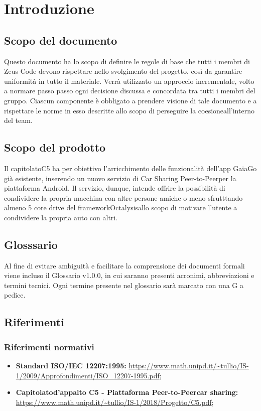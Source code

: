 \section {Introduzione}
\subsection {Scopo del documento}
Questo documento  ha lo scopo di definire le regole di base che tutti i membri di Zeus Code devono rispettare nello svolgimento del progetto, così da garantire uniformità in tutto il materiale. Verrà utilizzato un approccio incrementale\glo, volto a normare passo passo ogni decisione discussa e concordata tra tutti i membri del gruppo. Ciascun componente è obbligato a prendere visione di tale documento e a rispettare le norme in esso descritte allo scopo di perseguire la coesione\glosp all'interno del team.
\subsection {Scopo del prodotto}
Il capitolato\glosp C5 ha per obiettivo l'arricchimento delle funzionalità dell'app GaiaGo già esistente, inserendo un nuovo servizio di Car Sharing Peer-to-Peer\glosp per la piattaforma Android.
Il servizio, dunque, intende offrire la possibilità di condividere la propria macchina con altre persone amiche o meno sfrutttando almeno 5 core drive del framework\glosp Octalysis\glosp allo scopo di motivare l'utente a condividere la propria auto con altri.
\subsection {Glosssario}
Al fine di evitare ambiguità e facilitare la comprensione dei documenti formali viene incluso il Glossario v1.0.0, in cui saranno presenti acronimi, abbreviazioni e termini tecnici. Ogni termine presente nel glossario sarà marcato con una G a pedice.
\subsection {Riferimenti}
\subsubsection {Riferimenti normativi}

\begin{itemize}
	\item  \textbf{Standard ISO/IEC 12207:1995:}\newline
	\url{https://www.math.unipd.it/~tullio/IS-1/2009/Approfondimenti/ISO_12207-1995.pdf};
	\item \textbf{Capitolato\glosp d'appalto C5 - Piattaforma Peer-to-Peer\glosp car sharing:}\newline 
	\url{https://www.math.unipd.it/~tullio/IS-1/2018/Progetto/C5.pdf};
\end{itemize}


